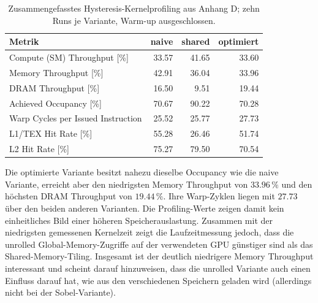 \begin{table}[H]
    \centering
    \setlength{\tabcolsep}{4pt}
    \begin{tabularx}{\textwidth}{l R R R}
        \toprule
        Metrik & naive & shared & optimiert \\
        \midrule
        Compute (SM) Throughput [\%] & 33.57 & 41.65 & 33.60 \\
        Memory Throughput [\%] & 42.91 & 36.04 & 33.96 \\
        DRAM Throughput [\%] & 16.50 & 9.51 & 19.44 \\
        Achieved Occupancy [\%] & 70.67 & 90.22 & 70.28 \\
        Warp Cycles per Issued Instruction & 25.52 & 25.77 & 27.73 \\
        L1/TEX Hit Rate [\%] & 55.28 & 26.46 & 51.74 \\
        L2 Hit Rate [\%] & 75.27 & 79.50 & 70.54 \\
        \bottomrule
    \end{tabularx}
    \caption{Zusammengefasstes Hysteresis-Kernelprofiling aus Anhang D;
        zehn Runs je Variante, Warm-up ausgeschlossen.}
    \label{tab:hysteresis-ncu}
\end{table}

Die optimierte Variante besitzt nahezu dieselbe Occupancy wie die naive
Variante, erreicht aber den niedrigsten Memory Throughput von $33.96\,\%$ und
den höchsten DRAM Throughput von $19.44\,\%$. Ihre Warp-Zyklen liegen mit
$27.73$ über den beiden anderen Varianten. Die Profiling-Werte zeigen damit
kein einheitliches Bild einer höheren Speicherauslastung. Zusammen mit der
niedrigsten gemessenen Kernelzeit zeigt die Laufzeitmessung jedoch, dass die
unrolled Global-Memory-Zugriffe auf der verwendeten GPU günstiger sind als das
Shared-Memory-Tiling. Insgesamt ist der deutlich niedrigere Memory Throughput interessant und scheint darauf hinzuweisen, dass die unrolled Variante auch einen Einfluss darauf hat, wie aus den verschiedenen Speichern geladen wird (allerdings nicht bei der Sobel-Variante).